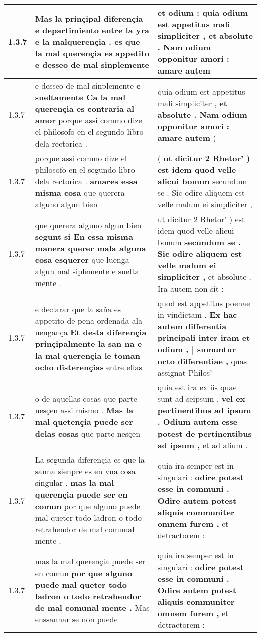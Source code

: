 \begin{tabular}{|p{1cm}|p{6.5cm}|p{6.5cm}|}
1.3.7 & Mas la prinçipal diferençia e departimiento entre la yra e la malquerençia . \textbf{ es que la mal querençia es appetito } e desseo de mal sinplemente & et odium : \textbf{ quia odium est appetitus mali simpliciter , } et absolute . Nam odium opponitur amori : amare autem \\\hline
1.3.7 & e desseo de mal sinplemente \textbf{ e sueltamente Ca la mal querençia es contraria al amor } porque assi commo dize el philosofo en el segundo libro dela rectorica . & quia odium est appetitus mali simpliciter , \textbf{ et absolute . Nam odium opponitur amori : amare autem } ( \\\hline
1.3.7 & porque assi commo dize el philosofo en el segundo libro dela rectorica . \textbf{ amares essa misma cosa } que querera alguno algun bien & ( \textbf{ ut dicitur 2 Rhetor’ ) est idem quod velle alicui bonum } secundum se . Sic odire aliquem est velle malum ei simpliciter , \\\hline
1.3.7 & que querera alguno algun bien \textbf{ segunt si En essa misma manera querer mala alguna cosa esquerer } que luenga algun mal siplemente e suelta mente . & ut dicitur 2 Rhetor’ ) est idem quod velle alicui bonum \textbf{ secundum se . Sic odire aliquem est velle malum ei simpliciter , } et absolute . Ira autem non sit : \\\hline
1.3.7 & e declarar que la saña es appetito de pena ordenada ala uengança \textbf{ Et desta diferençia prinçipalmente la san na e la mal querençia le toman ocho disterençias } entre ellas & quod est appetitus poenae in vindictam . \textbf{ Ex hac autem differentia principali inter iram et odium , | sumuntur octo differentiae , } quas assignat Philos’ \\\hline
1.3.7 & o de aquellas cosas que parte nesçen assi mismo . \textbf{ Mas la mal quetençia puede ser delas cosas } que parte nesçen & quia est ira ex iis quae sunt ad seipsum , \textbf{ vel ex pertinentibus ad ipsum . Odium autem esse potest de pertinentibus ad ipsum , } et ad alium . \\\hline
1.3.7 & La segunda diferençia es que la sanna sienpre es en vna cosa singular . \textbf{ mas la mal querençia puede ser en comun } por que alguno puede mal queter todo ladron o todo retrahendor de mal comunal mente . & quia ira semper est in singulari : \textbf{ odire potest esse in communi . Odire autem potest aliquis communiter omnem furem , } et detractorem : \\\hline
1.3.7 & mas la mal querençia puede ser en comun \textbf{ por que alguno puede mal queter todo ladron o todo retrahendor de mal comunal mente . } Mas enssannar se non puede & quia ira semper est in singulari : \textbf{ odire potest esse in communi . Odire autem potest aliquis communiter omnem furem , } et detractorem : \\\hline

\end{tabular}
